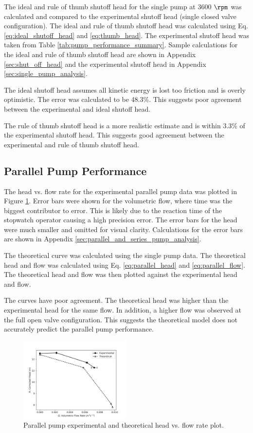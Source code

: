 \noindent The ideal and rule of thumb shutoff head for the single pump at 3600 $\unit{\rpm}$ was calculated and compared to the experimental shutoff head (single closed valve configuration). The ideal and rule of thumb shutoff head was calculated using Eq. \ref{eq:ideal_shutoff_head} and \ref{eq:thumb_head}. The experimental shutoff head was taken from Table \ref{tab:pump_performance_summary}. Sample calculations for the ideal and rule of thumb shutoff head are shown in Appendix \ref{sec:shut_off_head} and the experimental shutoff head in Appendix \ref{sec:single_pump_analysis}.

The ideal shutoff head assumes all kinetic energy is lost too friction and is overly optimistic. The error was calculated to be 48.3\%. This suggests poor agreement between the experimental and ideal shutoff head.

The rule of thumb shutoff head is a more realistic estimate and is within 3.3\% of the experimental shutoff head. This suggests good agreement between the experimental and rule of thumb shutoff head.

\subsection{Parallel Pump Performance}
The head vs. flow rate for the experimental parallel pump data was plotted in Figure \ref{fig:parallel_pump_plot}. Error bars were shown for the volumetric flow, where time was the biggest contributor to error. This is likely due to the reaction time of the stopwatch operator causing a high precision error. The error bars for the head were much smaller and omitted for visual clarity. Calculations for the error bars are shown in Appendix \ref{sec:parallel_and_series_pump_analysis}.

The theoretical curve was calculated using the single pump data. The theoretical head and flow was calculated using Eq. \ref{eq:parallel_head} and \ref{eq:parallel_flow}. The theoretical head and flow was then plotted against the experimental head and flow.

The curves have poor agreement. The theoretical head was higher than the experimental head for the same flow. In addition, a higher flow was observed at the full open valve configuration. This suggests the theoretical model does not accurately predict the parallel pump performance.
\begin{figure}[H]
    \centering
    \includegraphics[width=0.5\textwidth]{Sections/Figures/Parallel Pump Plot.png}
    \caption{Parallel pump experimental and theoretical head vs. flow rate plot.}
    \label{fig:parallel_pump_plot}
\end{figure}

